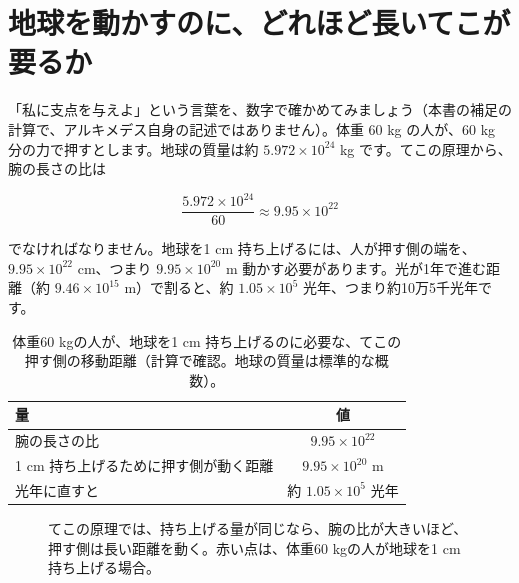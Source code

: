 \documentclass[a4paper,11pt,openany]{ltjsbook}
\begin{document}
\section{地球を動かすのに、どれほど長いてこが要るか}

「私に支点を与えよ」という言葉を、数字で確かめてみましょう（本書の補足の計算で、アルキメデス自身の記述ではありません）。体重 $60$ kg の人が、$60$ kg 分の力で押すとします。地球の質量は約 $5.972\times10^{24}$ kg です。てこの原理から、腕の長さの比は

\[
\frac{5.972\times10^{24}}{60}\approx9.95\times10^{22}
\]

でなければなりません。地球を1 cm 持ち上げるには、人が押す側の端を、$9.95\times10^{22}$ cm、つまり $9.95\times10^{20}$ m 動かす必要があります。光が1年で進む距離（約 $9.46\times10^{15}$ m）で割ると、約 $1.05\times10^{5}$ 光年、つまり約10万5千光年です。

\begin{table}[htbp]
\centering
\begin{tabular}{lc}
\toprule
量 & 値\\
\midrule
腕の長さの比 & $9.95\times10^{22}$\\
1 cm 持ち上げるために押す側が動く距離 & $9.95\times10^{20}$ m\\
光年に直すと & 約 $1.05\times10^{5}$ 光年\\
\bottomrule
\end{tabular}
\caption{体重60 kgの人が、地球を1 cm 持ち上げるのに必要な、てこの押す側の移動距離（計算で確認。地球の質量は標準的な概数）。}
\end{table}

\begin{figure}[htbp]
\centering
{}
\caption{てこの原理では、持ち上げる量が同じなら、腕の比が大きいほど、押す側は長い距離を動く。赤い点は、体重60 kgの人が地球を1 cm 持ち上げる場合。}
\end{figure}
\end{document}
